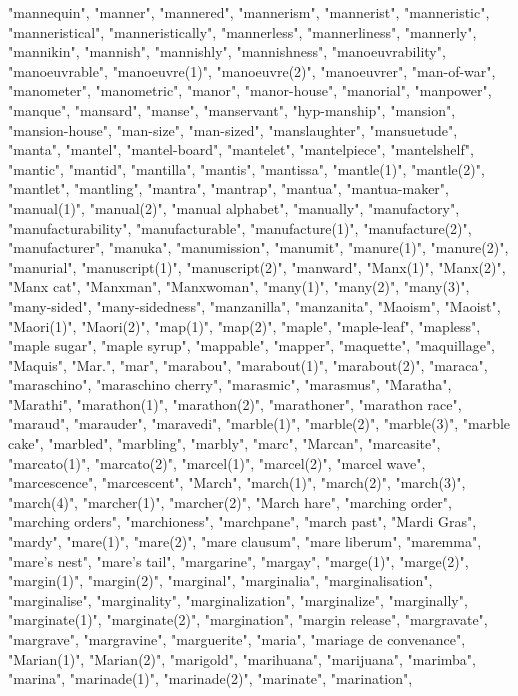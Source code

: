 "mannequin",
"manner",
"mannered",
"mannerism",
"mannerist",
"manneristic",
"manneristical",
"manneristically",
"mannerless",
"mannerliness",
"mannerly",
"mannikin",
"mannish",
"mannishly",
"mannishness",
"manoeuvrability",
"manoeuvrable",
"manoeuvre(1)",
"manoeuvre(2)",
"manoeuvrer",
"man-of-war",
"manometer",
"manometric",
"manor",
"manor-house",
"manorial",
"manpower",
"manque",
"mansard",
"manse",
"manservant",
"hyp-manship",
"mansion",
"mansion-house",
"man-size",
"man-sized",
"manslaughter",
"mansuetude",
"manta",
"mantel",
"mantel-board",
"mantelet",
"mantelpiece",
"mantelshelf",
"mantic",
"mantid",
"mantilla",
"mantis",
"mantissa",
"mantle(1)",
"mantle(2)",
"mantlet",
"mantling",
"mantra",
"mantrap",
"mantua",
"mantua-maker",
"manual(1)",
"manual(2)",
"manual alphabet",
"manually",
"manufactory",
"manufacturability",
"manufacturable",
"manufacture(1)",
"manufacture(2)",
"manufacturer",
"manuka",
"manumission",
"manumit",
"manure(1)",
"manure(2)",
"manurial",
"manuscript(1)",
"manuscript(2)",
"manward",
"Manx(1)",
"Manx(2)",
"Manx cat",
"Manxman",
"Manxwoman",
"many(1)",
"many(2)",
"many(3)",
"many-sided",
"many-sidedness",
"manzanilla",
"manzanita",
"Maoism",
"Maoist",
"Maori(1)",
"Maori(2)",
"map(1)",
"map(2)",
"maple",
"maple-leaf",
"mapless",
"maple sugar",
"maple syrup",
"mappable",
"mapper",
"maquette",
"maquillage",
"Maquis",
"Mar.",
"mar",
"marabou",
"marabout(1)",
"marabout(2)",
"maraca",
"maraschino",
"maraschino cherry",
"marasmic",
"marasmus",
"Maratha",
"Marathi",
"marathon(1)",
"marathon(2)",
"marathoner",
"marathon race",
"maraud",
"marauder",
"maravedi",
"marble(1)",
"marble(2)",
"marble(3)",
"marble cake",
"marbled",
"marbling",
"marbly",
"marc",
"Marcan",
"marcasite",
"marcato(1)",
"marcato(2)",
"marcel(1)",
"marcel(2)",
"marcel wave",
"marcescence",
"marcescent",
"March",
"march(1)",
"march(2)",
"march(3)",
"march(4)",
"marcher(1)",
"marcher(2)",
"March hare",
"marching order",
"marching orders",
"marchioness",
"marchpane",
"march past",
"Mardi Gras",
"mardy",
"mare(1)",
"mare(2)",
"mare clausum",
"mare liberum",
"maremma",
"mare's nest",
"mare's tail",
"margarine",
"margay",
"marge(1)",
"marge(2)",
"margin(1)",
"margin(2)",
"marginal",
"marginalia",
"marginalisation",
"marginalise",
"marginality",
"marginalization",
"marginalize",
"marginally",
"marginate(1)",
"marginate(2)",
"margination",
"margin release",
"margravate",
"margrave",
"margravine",
"marguerite",
"maria",
"mariage de convenance",
"Marian(1)",
"Marian(2)",
"marigold",
"marihuana",
"marijuana",
"marimba",
"marina",
"marinade(1)",
"marinade(2)",
"marinate",
"marination",
